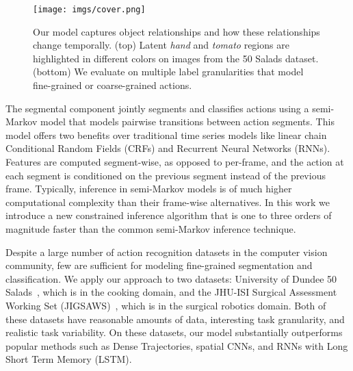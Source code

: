 \documentclass[runningheads]{llncs}
\begin{document}
\begin{figure}[t]
	\center
	\texttt{[image: imgs/cover.png]}
	\caption{Our model captures object relationships and how these relationships change temporally. (top) Latent \textit{hand} and \textit{tomato} regions are highlighted in different colors on images from the 50 Salads dataset. (bottom) We evaluate on multiple label granularities that model fine-grained or coarse-grained actions.}
	\label{fig:cover}
\end{figure}


The segmental component jointly segments and classifies actions using a semi-Markov model that models pairwise transitions between action segments. 
This model offers two benefits over traditional time series models like linear chain Conditional Random Fields (CRFs) and Recurrent Neural Networks (RNNs). 
Features are computed segment-wise, as opposed to per-frame, and the action at each segment is conditioned on the previous segment instead of the previous frame.
Typically, inference in semi-Markov models is of much higher computational complexity than their frame-wise alternatives. 
In this work we introduce a new constrained inference algorithm that is one to three orders of magnitude faster than the common semi-Markov inference technique.




























Despite a large number of action recognition datasets in the computer vision community, few are sufficient for modeling fine-grained segmentation and classification. 
We apply our approach to two datasets: University of Dundee 50 Salads~\cite{stein_ubicomp_2013}, which is in the cooking domain, and 
the JHU-ISI Surgical Assessment Working Set (JIGSAWS)~\cite{JIGSAWS}, which is in the surgical robotics domain.
Both of these datasets have reasonable amounts of data, interesting task granularity, and realistic task variability.
On these datasets, our model substantially outperforms 
popular methods such as Dense Trajectories, spatial CNNs, and RNNs with Long Short Term Memory (LSTM).
\end{document}
